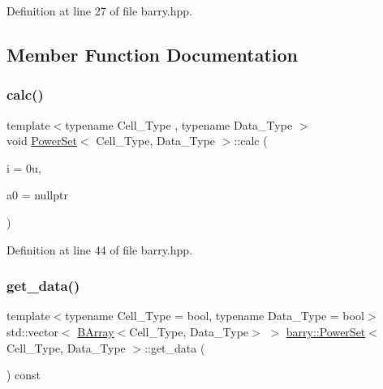 Definition at line 27 of file barry.\+hpp.



\subsection{Member Function Documentation}
\mbox{\label{classbarry_1_1_power_set_a93e31ba8891642db6ecf0fca82c71f6a}} 
\subsubsection{\texorpdfstring{calc()}{calc()}}
{\footnotesize\ttfamily template$<$typename Cell\+\_\+\+Type , typename Data\+\_\+\+Type $>$ \\
void \hyperlink{classbarry_1_1_power_set}{Power\+Set}$<$ Cell\+\_\+\+Type, Data\+\_\+\+Type $>$\+::calc (\begin{DoxyParamCaption}\item[{\hyperlink{namespacebarry_a11dfc53ddb4672278319aa04f1e09a6c}{uint}}]{i = {\ttfamily 0u},  }\item[{\hyperlink{classbarry_1_1_b_array}{B\+Array}$<$ Cell\+\_\+\+Type, Data\+\_\+\+Type $>$ $\ast$}]{a0 = {\ttfamily nullptr} }\end{DoxyParamCaption})\hspace{0.3cm}{\ttfamily [inline]}}



Definition at line 44 of file barry.\+hpp.

\mbox{\label{classbarry_1_1_power_set_a273dae1795f3d663ef031c50bd218788}} 
\subsubsection{\texorpdfstring{get\+\_\+data()}{get\_data()}}
{\footnotesize\ttfamily template$<$typename Cell\+\_\+\+Type  = bool, typename Data\+\_\+\+Type  = bool$>$ \\
std\+::vector$<$ \hyperlink{classbarry_1_1_b_array}{B\+Array}$<$Cell\+\_\+\+Type, Data\+\_\+\+Type$>$ $>$ \hyperlink{classbarry_1_1_power_set}{barry\+::\+Power\+Set}$<$ Cell\+\_\+\+Type, Data\+\_\+\+Type $>$\+::get\+\_\+data (\begin{DoxyParamCaption}{ }\end{DoxyParamCaption}) const\hspace{0.3cm}{\ttfamily [inline]}}



